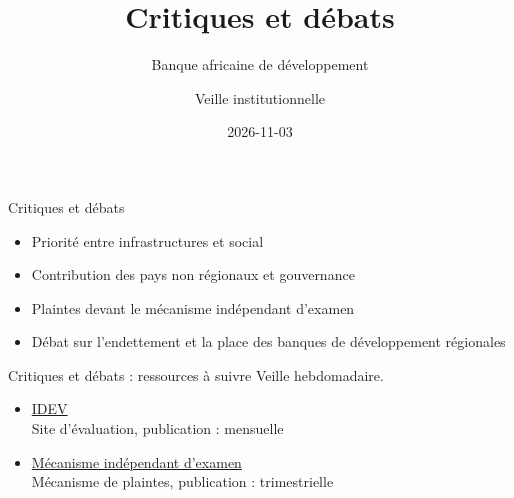 \documentclass[aspectratio=169,11pt]{beamer}
\title{Critiques et débats}
\subtitle{Banque africaine de développement}
\author{Veille institutionnelle}
\date{2026-11-03}
\begin{document}
\begin{frame}\titlepage\end{frame}

\begin{frame}{Critiques et débats}
\begin{itemize}
\item Priorité entre infrastructures et social
\item Contribution des pays non régionaux et gouvernance
\item Plaintes devant le mécanisme indépendant d'examen
\item Débat sur l'endettement et la place des banques de développement régionales
\end{itemize}
\end{frame}

\begin{frame}{Critiques et débats : ressources à suivre}
\small
Veille hebdomadaire.
\begin{itemize}
\item \href{https://idev.afdb.org}{IDEV}\\{\footnotesize Site d'évaluation, publication : mensuelle}
\item \href{https://www.afdb.org/en/independent-review-mechanism}{Mécanisme indépendant d'examen}\\{\footnotesize Mécanisme de plaintes, publication : trimestrielle}
\end{itemize}
\end{frame}
\end{document}
